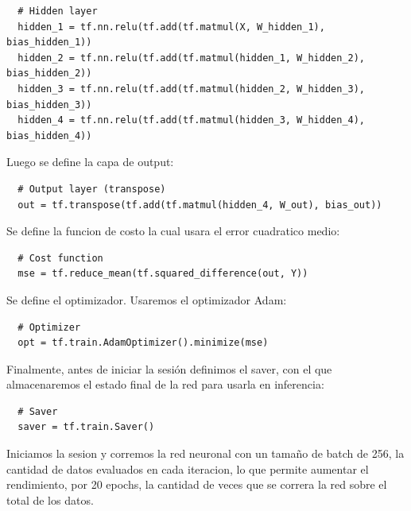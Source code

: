 \documentclass[osajnl,twocolumn,showpacs,superscriptaddress,10pt]{revtex4-1} %
\begin{document}
\begin{verbatim}
  # Hidden layer
  hidden_1 = tf.nn.relu(tf.add(tf.matmul(X, W_hidden_1), bias_hidden_1))
  hidden_2 = tf.nn.relu(tf.add(tf.matmul(hidden_1, W_hidden_2), bias_hidden_2))
  hidden_3 = tf.nn.relu(tf.add(tf.matmul(hidden_2, W_hidden_3), bias_hidden_3))
  hidden_4 = tf.nn.relu(tf.add(tf.matmul(hidden_3, W_hidden_4), bias_hidden_4))
\end{verbatim}

Luego se define la capa de output:

\begin{verbatim}
  # Output layer (transpose)
  out = tf.transpose(tf.add(tf.matmul(hidden_4, W_out), bias_out))
\end{verbatim}

Se define la funcion de costo la cual usara el error cuadratico medio:

\begin{verbatim}
  # Cost function
  mse = tf.reduce_mean(tf.squared_difference(out, Y))
\end{verbatim}

Se define el optimizador. Usaremos el optimizador Adam:

\begin{verbatim}
  # Optimizer
  opt = tf.train.AdamOptimizer().minimize(mse)
\end{verbatim}

Finalmente, antes de iniciar la sesión definimos el saver, con el que almacenaremos el estado final de la red para usarla en inferencia:

\begin{verbatim}
  # Saver
  saver = tf.train.Saver()
\end{verbatim}

Iniciamos la sesion y corremos la red neuronal con un tamaño de batch de 256, la cantidad de datos evaluados en cada iteracion, lo que permite aumentar el rendimiento, por 20 epochs, la cantidad de veces que se correra la red sobre el total de los datos.
\end{document}
